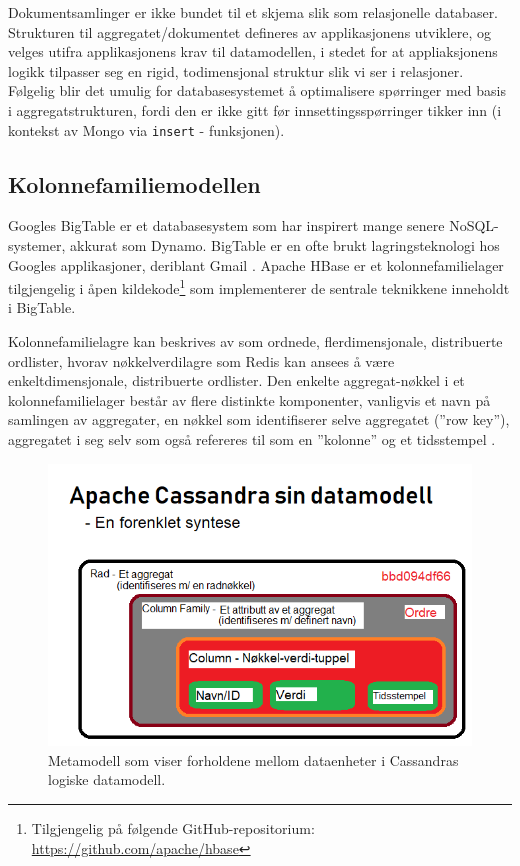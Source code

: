 Dokumentsamlinger er ikke bundet til et skjema slik som relasjonelle databaser. Strukturen til aggregatet/dokumentet defineres av applikasjonens utviklere, og velges utifra applikasjonens krav til datamodellen, i stedet for at appliaksjonens logikk tilpasser seg en rigid, todimensjonal struktur slik vi ser i relasjoner. Følgelig blir det umulig for databasesystemet å optimalisere spørringer med basis i aggregatstrukturen, fordi den er ikke gitt før innsettingsspørringer tikker inn (i kontekst av Mongo via \texttt{insert} - funksjonen).

\subsection{Kolonnefamiliemodellen}

Googles BigTable er et databasesystem som har inspirert mange senere NoSQL-systemer, akkurat som Dynamo. BigTable er en ofte brukt lagringsteknologi hos Googles applikasjoner, deriblant Gmail \citep{elmasri2014}. Apache HBase er et kolonnefamilielager tilgjengelig i åpen kildekode\footnote{Tilgjengelig på følgende GitHub-repositorium: \url{https://github.com/apache/hbase}} som implementerer de sentrale teknikkene inneholdt i BigTable.

Kolonnefamilielagre kan beskrives av \cite{elmasri2014} som ordnede, flerdimensjonale, distribuerte ordlister, hvorav nøkkelverdilagre som Redis kan ansees å være enkeltdimensjonale, distribuerte ordlister. Den enkelte aggregat-nøkkel i et kolonnefamilielager består av flere distinkte komponenter, vanligvis et navn på samlingen av aggregater, en nøkkel som identifiserer selve aggregatet (''row key''), aggregatet i seg selv som også refereres til som en ''kolonne'' og et tidsstempel \citep{elmasri2014}.

\newpage

\begin{figure}[!ht]
    \centering
    \includegraphics[scale=0.7]{fig/kolonneorientert.png}
    \caption{Metamodell som viser forholdene mellom dataenheter i Cassandras logiske datamodell.}
    \label{fig3}
\end{figure}


